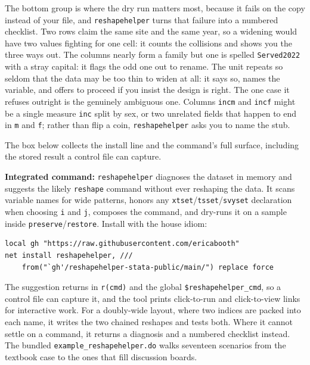 \documentclass[
    a4paper,
    fontsize=10pt,
    twoside=true,
    numbers=noenddot,
]{kaobook}
\begin{document}
The bottom group is where the dry run matters most, because it fails on the copy instead of your file, and \texttt{reshapehelper} turns that failure into a numbered checklist. Two rows claim the same site and the same year, so a widening would have two values fighting for one cell: it counts the collisions and shows you the three ways out. The columns nearly form a family but one is spelled \texttt{Served2022} with a stray capital: it flags the odd one out to rename. The unit repeats so seldom that the data may be too thin to widen at all: it says so, names the variable, and offers to proceed if you insist the design is right. The one case it refuses outright is the genuinely ambiguous one. Columns \texttt{incm} and \texttt{incf} might be a single measure \texttt{inc} split by sex, or two unrelated fields that happen to end in \texttt{m} and \texttt{f}; rather than flip a coin, \texttt{reshapehelper} asks you to name the stub.

The box below collects the install line and the command's full surface, including the stored result a control file can capture.

\begin{kaobox}[frametitle=Package Integration: \texttt{reshapehelper}]
\textbf{Integrated command:} \texttt{reshapehelper} diagnoses the dataset in memory and suggests the likely \texttt{reshape} command without ever reshaping the data. It scans variable names for wide patterns, honors any \texttt{xtset}/\texttt{tsset}/\texttt{svyset} declaration when choosing \texttt{i} and \texttt{j}, composes the command, and dry-runs it on a sample inside \texttt{preserve}/\texttt{restore}. Install with the house idiom:
\par
{\footnotesize
\begin{verbatim}
local gh "https://raw.githubusercontent.com/ericabooth"
net install reshapehelper, ///
    from("`gh'/reshapehelper-stata-public/main/") replace force
\end{verbatim}
}
The suggestion returns in \texttt{r(cmd)} and the global \texttt{\$reshapehelper\_cmd}, so a control file can capture it, and the tool prints click-to-run and click-to-view links for interactive work. For a doubly-wide layout, where two indices are packed into each name, it writes the two chained reshapes and tests both. Where it cannot settle on a command, it returns a diagnosis and a numbered checklist instead. The bundled \texttt{example\_reshapehelper.do} walks seventeen scenarios from the textbook case to the ones that fill discussion boards.
\end{kaobox}
\end{document}
